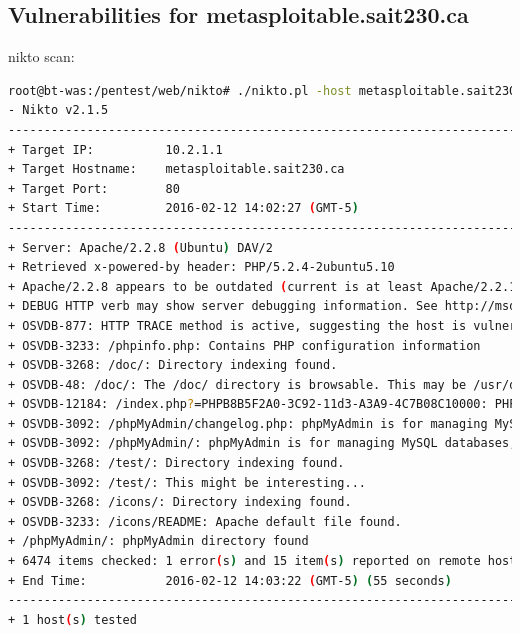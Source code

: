\documentclass{article}
\begin{document}
\subsection{Vulnerabilities for metasploitable.sait230.ca}

nikto scan:

\begin{lstlisting}[language=Bash]
root@bt-was:/pentest/web/nikto# ./nikto.pl -host metasploitable.sait230.ca -p 80
- Nikto v2.1.5
---------------------------------------------------------------------------
+ Target IP:          10.2.1.1
+ Target Hostname:    metasploitable.sait230.ca
+ Target Port:        80
+ Start Time:         2016-02-12 14:02:27 (GMT-5)
---------------------------------------------------------------------------
+ Server: Apache/2.2.8 (Ubuntu) DAV/2
+ Retrieved x-powered-by header: PHP/5.2.4-2ubuntu5.10
+ Apache/2.2.8 appears to be outdated (current is at least Apache/2.2.19). Apache 1.3.42 (final release) and 2.0.64 are also current.
+ DEBUG HTTP verb may show server debugging information. See http://msdn.microsoft.com/en-us/library/e8z01xdh%28VS.80%29.aspx for details.
+ OSVDB-877: HTTP TRACE method is active, suggesting the host is vulnerable to XST
+ OSVDB-3233: /phpinfo.php: Contains PHP configuration information
+ OSVDB-3268: /doc/: Directory indexing found.
+ OSVDB-48: /doc/: The /doc/ directory is browsable. This may be /usr/doc.
+ OSVDB-12184: /index.php?=PHPB8B5F2A0-3C92-11d3-A3A9-4C7B08C10000: PHP reveals potentially sensitive information via certain HTTP requests that contain specific QUERY strings.
+ OSVDB-3092: /phpMyAdmin/changelog.php: phpMyAdmin is for managing MySQL databases, and should be protected or limited to authorized hosts.
+ OSVDB-3092: /phpMyAdmin/: phpMyAdmin is for managing MySQL databases, and should be protected or limited to authorized hosts.
+ OSVDB-3268: /test/: Directory indexing found.
+ OSVDB-3092: /test/: This might be interesting...
+ OSVDB-3268: /icons/: Directory indexing found.
+ OSVDB-3233: /icons/README: Apache default file found.
+ /phpMyAdmin/: phpMyAdmin directory found
+ 6474 items checked: 1 error(s) and 15 item(s) reported on remote host
+ End Time:           2016-02-12 14:03:22 (GMT-5) (55 seconds)
---------------------------------------------------------------------------
+ 1 host(s) tested
\end{lstlisting}
\end{document}
